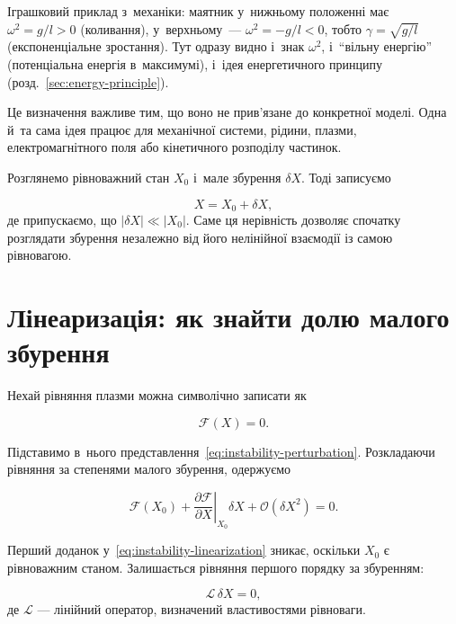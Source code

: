 Іграшковий приклад з~механіки: маятник у~нижньому положенні має $\omega^2=g/l>0$ (коливання), у~верхньому~--- $\omega^2=-g/l<0$,
тобто $\gamma=\sqrt{g/l}$ (експоненціальне зростання). Тут одразу видно і~знак $\omega^2$, і~\enquote{вільну енергію}
(потенціальна енергія в~максимумі), і~ідея енергетичного принципу (розд.~\ref{sec:energy-principle}).

Це визначення важливе тим, що воно не прив'язане до конкретної моделі.
Одна й~та сама ідея працює для механічної системи, рідини, плазми,
електромагнітного поля або кінетичного розподілу частинок.

Розглянемо рівноважний стан $X_0$ і~мале збурення $\delta X$. Тоді
записуємо

\begin{equation}
X=X_0+\delta X,
\label{eq:instability-perturbation}
\end{equation}
%
де припускаємо, що $|\delta X|\ll |X_0|$. Саме ця нерівність дозволяє
спочатку розглядати збурення незалежно від його нелінійної взаємодії
із самою рівновагою.

\section{Лінеаризація: як знайти долю малого збурення}

Нехай рівняння плазми можна символічно записати як

\begin{equation}
\mathcal{F}(X)=0.
\label{eq:instability-equilibrium-equation}
\end{equation}

Підставимо в~нього представлення~\eqref{eq:instability-perturbation}.
Розкладаючи рівняння за степенями малого збурення, одержуємо

\begin{equation}
\mathcal{F}(X_0)
+
\left.
\frac{\partial\mathcal{F}}{\partial X}
\right|_{X_0}\delta X
+\mathcal{O}(\delta X^2)=0.
\label{eq:instability-linearization}
\end{equation}

Перший доданок у~\eqref{eq:instability-linearization} зникає, оскільки
$X_0$ є рівноважним станом. Залишається рівняння першого порядку за
збуренням:

\begin{equation}
\mathcal{L}\,\delta X=0,
\label{eq:instability-linear-equation}
\end{equation}
%
де $\mathcal{L}$ --- лінійний оператор, визначений властивостями
рівноваги.

